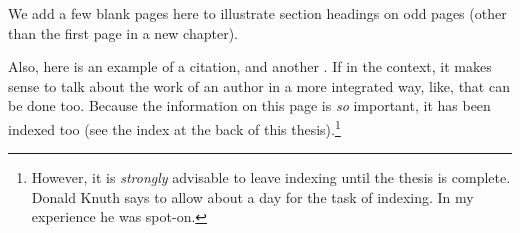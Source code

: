 We add a few blank pages here to illustrate section
headings on odd
pages (other than the first page in a new chapter).

Also, here is an example of a citation, and another
.  If in the context,
it makes sense to talk about the work of an author in a more
integrated way, like, that can be done
too.  Because the information on this page
is \emph{so} important, it has been indexed too (see the index at the
back of this thesis).\footnote{However, it is \emph{strongly}
  advisable to leave indexing until the thesis is complete.  Donald
  Knuth says to allow about a day for the task of indexing.  In my
  experience he was spot-on.}

